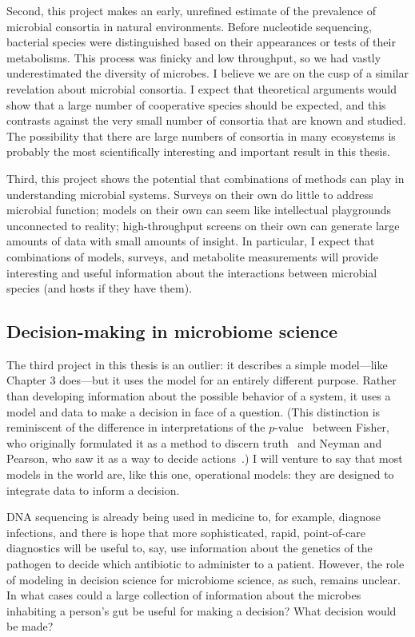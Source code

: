 Second, this project makes an early, unrefined estimate of the prevalence
of microbial consortia in natural environments. Before nucleotide sequencing,
bacterial species were distinguished based on their appearances or tests
of their metabolisms. This process was finicky and low throughput, so we
had vastly underestimated the diversity of microbes. I believe we are on
the cusp of a similar revelation about microbial consortia. I expect that
theoretical arguments would show that a large number of cooperative species
should be expected, and this contrasts against the very small number of
consortia that are known and studied. The possibility that there are
large numbers of consortia in many ecosystems is probably the most
scientifically interesting and important result in this thesis.

Third, this project shows the potential that combinations of methods
can play in understanding microbial systems. Surveys on their own
do little to address microbial function; models on their own
can seem like intellectual playgrounds unconnected to reality; high-throughput
screens on their own can generate large amounts of data with small amounts
of insight. In particular, I expect that combinations of models, surveys,
and metabolite measurements will provide interesting and useful
information about the interactions between microbial species (and hosts if
they have them).

\subsection{Decision-making in microbiome science}
The third project in this thesis is an outlier: it describes a
simple model---like Chapter 3 does---but it uses the model for
an entirely different purpose. Rather than developing information
about the possible behavior of a system, it uses a model and data to
make a decision in face of a question. (This distinction is reminiscent
of the difference in interpretations of the $p$-value~\cite{goodman_toward_1999} between Fisher,
who originally formulated it as a method to discern truth~\cite{fisher_statistical_1973}
and Neyman and Pearson, who saw it as a way to decide actions~\cite{neyman_problem_1933}.)
I will venture to say that most models in the world are, like this one,
operational models: they are designed to integrate data to inform a 
decision.

DNA sequencing is already being used in medicine to, for example,
diagnose infections, and there is hope that more sophisticated,
rapid, point-of-care diagnostics will be useful to, say, use information
about the genetics of the pathogen to decide
which antibiotic to administer to a patient.
However, the role of modeling in decision science
for microbiome science, as such, remains unclear. In what cases could
a large collection of information about the microbes inhabiting a
person's gut be useful for making a decision? What decision would
be made?


